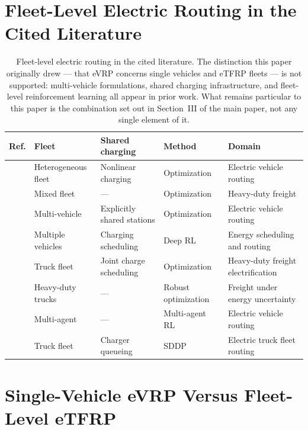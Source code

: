 \documentclass[journal]{IEEEtran}
\begin{document}
\section{Fleet-Level Electric Routing in the Cited Literature}

\begin{table}[t]
\centering
\caption{Fleet-level electric routing in the cited literature. The distinction this paper originally drew --- that eVRP concerns single vehicles and eTFRP fleets --- is not supported: multi-vehicle formulations, shared charging infrastructure, and fleet-level reinforcement learning all appear in prior work. What remains particular to this paper is the combination set out in Section~III of the main paper, not any single element of it.}
\label{tab:fleet_matrix}
\small
\begin{tabular}{p{3.4cm}p{2.1cm}p{2.3cm}p{2.0cm}p{4.2cm}}
\toprule
\textbf{Ref.} & \textbf{Fleet} & \textbf{Shared charging} & \textbf{Method} & \textbf{Domain} \\
\midrule
\cite{WANG2025104932} & Heterogeneous fleet & Nonlinear charging & Optimization & Electric vehicle routing \\
\cite{WANG2024123407} & Mixed fleet & --- & Optimization & Heavy-duty freight \\
\cite{https://doi.org/10.1111/itor.12620} & Multi-vehicle & Explicitly shared stations & Optimization & Electric vehicle routing \\
\cite{ALQAHTANI2022122626} & Multiple vehicles & Charging scheduling & Deep RL & Energy scheduling and routing \\
\cite{BRAGIN2024104494} & Truck fleet & Joint charge scheduling & Optimization & Heavy-duty freight electrification \\
\cite{AMIRI2023109108} & Heavy-duty trucks & --- & Robust optimization & Freight under energy uncertainty \\
\cite{10310266} & Multi-agent & --- & Multi-agent RL & Electric vehicle routing \\
\cite{ziyan2025} & Truck fleet & Charger queueing & SDDP & Electric truck fleet routing \\
\bottomrule
\end{tabular}
\end{table}

\section{Single-Vehicle eVRP Versus Fleet-Level eTFRP}
\end{document}
